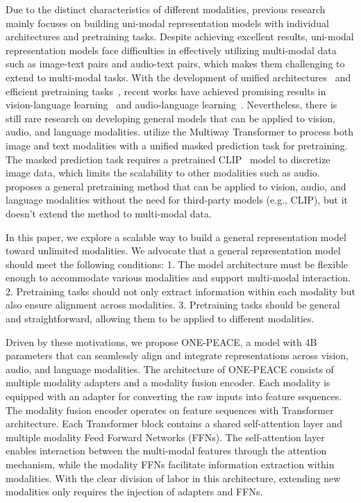 \documentclass{article}
\newcommand{\onepeace}{ONE-PEACE\xspace}
\begin{document}
Due to the distinct characteristics of different modalities, previous research mainly focuses on building uni-modal representation models with individual architectures and pretraining tasks.
Despite achieving excellent results, uni-modal representation models face difficulties in effectively utilizing multi-modal data such as image-text pairs and audio-text pairs, which makes them challenging to extend to multi-modal tasks.
With the development of unified architectures~\cite{transformer,vit,perceiver,perceiverio} and efficient pretraining tasks~\cite{bert,beit,mae,clip}, recent works have achieved promising results in vision-language learning~\cite{ofa,flamingo,coca,beit3,blip,pali} and audio-language learning~\cite{audioclip,wav2clip,clap,speecht5}. Nevertheless, there is still rare research on developing general models that can be applied to vision, audio, and language modalities.
\cite{beit3} utilize the Multiway Transformer to process both image and text modalities with a unified masked prediction task for pretraining. The masked prediction task requires a pretrained CLIP~\cite{clip} model to discretize image data, which limits the scalability to other modalities such as audio.
\cite{data2vec} proposes a general pretraining method that can be applied to vision, audio, and language modalities without the need for third-party models (e.g., CLIP), but it doesn't extend the method to multi-modal data.


In this paper, we explore a scalable way to build a general representation model toward unlimited modalities.
We advocate that a general representation model should meet the following conditions:
1. The model architecture must be flexible enough to accommodate various modalities and support multi-modal interaction. 
2. Pretraining tasks should not only extract information within each modality but also ensure alignment across modalities. 
3. Pretraining tasks should be general and straightforward, allowing them to be applied to different modalities.



Driven by these motivations, we propose \onepeace, a model with 4B parameters that can seamlessly align and integrate representations across vision, audio, and language modalities.
The architecture of \onepeace consists of multiple modality adapters and a modality fusion encoder.
Each modality is equipped with an adapter for converting the raw inputs into feature sequences.
The modality fusion encoder operates on feature sequences with Transformer architecture. Each Transformer block contains a shared self-attention layer and multiple modality Feed Forward Networks (FFNs).
The self-attention layer enables interaction between the multi-modal features through the attention mechanism, while the modality FFNs facilitate information extraction within modalities.
With the clear division of labor in this architecture, extending new modalities only requires the injection of adapters and FFNs.
\end{document}
